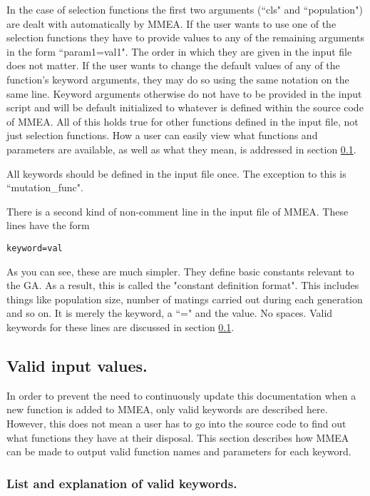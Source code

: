 \documentclass{article}
\begin{document}
In the case of selection functions the first two arguments (``cls" and ``population") are dealt with automatically by MMEA. If the user wants to use one of the selection functions they have to provide values to any of the remaining arguments in the form ``param1=val1". The order in which they are given in the input file does not matter. If the user wants to change the default values of any of the function's keyword arguments, they may do so using the same notation on the same line. Keyword arguments otherwise do not have to be provided in the input script and will be default initialized to whatever is defined within the source code of MMEA. All of this holds true for other functions defined in the input file, not just selection functions. How a user can easily view what functions and parameters are available, as well as what they mean, is addressed in section \ref{input_files_valid_parameters}.

All keywords should be defined in the input file once. The exception to this is ``mutation\_func".

There is a second kind of non-comment line in the input file of MMEA. These lines have the form
\begin{verbatim}
keyword=val
\end{verbatim}
As you can see, these are much simpler. They define basic constants relevant to the GA. As a result, this is called the "constant definition format". This includes things like population size, number of matings carried out during each generation and so on. It is merely the keyword, a ``=" and the value. No spaces. Valid keywords for these lines are discussed in section \ref{input_files_valid_parameters}.

\subsection{Valid input values.}
\label{input_files_valid_parameters}
In order to prevent the need to continuously update this documentation when a new function is added to MMEA, only valid keywords are described here. However, this does not mean a user has to go into the source code to find out what functions they have at their disposal. This section describes how MMEA can be made to output valid function names and parameters for each keyword.
\subsubsection{List and explanation of valid keywords.}
\end{document}
